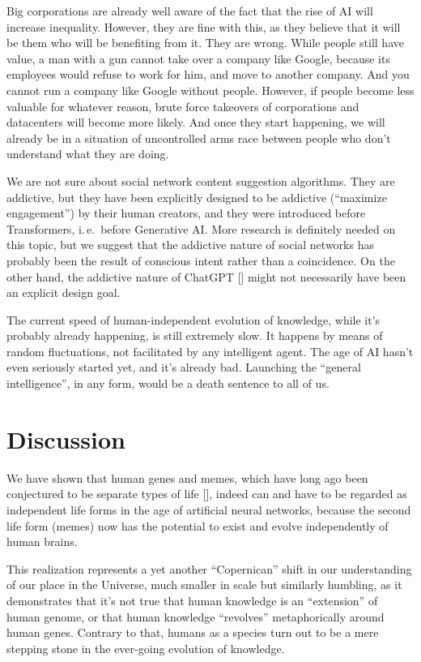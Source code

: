 \documentclass[12pt]{article}
\newcommand{\citestrut}[1]{\vphantom{[}{#1}\vphantom{]}}
\renewcommand{\cite}[1]{[\hyperlink{#1}{\citestrut{#1}}]}
\begin{document}
Big corporations are already well aware of the fact that the rise of AI will increase
inequality. However, they are fine with this, as they believe that it will be them who
will be benefiting from it. They are wrong. While people still have value, a man with a
gun cannot take over a company like Google, because its employees would refuse to work
for him, and move to another company. And you cannot run a company like Google without
people. However, if people become less valuable for whatever reason, brute force
takeovers of corporations and datacenters will become more likely. And once they start
happening, we will already be in a situation of uncontrolled arms race between people who
don't understand what they are doing.

We are not sure about social network content suggestion algorithms. They are addictive,
but they have been explicitly designed to be addictive (``maximize engagement'') by their
human creators, and they were introduced before Transformers, i.\,e.\ before Generative
AI. More research is definitely needed on this topic, but we suggest that the addictive
nature of social networks has probably been the result of conscious intent rather than a
coincidence. On the other hand, the addictive nature of ChatGPT \cite{Addiction} might
not necessarily have been an explicit design goal.

The current speed of human-independent evolution of knowledge, while it’s probably
already happening, is still extremely slow. It happens by means of random fluctuations,
not facilitated by any intelligent agent. The age of AI hasn't even seriously started
yet, and it's already bad. Launching the ``general intelligence'', in any form, would be
a death sentence to all of us.

\section{Discussion}

We have shown that human genes and memes, which have long ago been conjectured to be
separate types of life \cite{SelfishGene}, indeed can and have to be regarded as
independent life forms in the age of artificial neural networks, because the second life
form (memes) now has the potential to exist and evolve independently of human brains.

This realization represents a yet another ``Copernican'' shift in our understanding of
our place in the Universe, much smaller in scale but similarly humbling, as it
demonstrates that it's not true that human knowledge is an ``extension'' of human genome,
or that human knowledge ``revolves'' metaphorically around human genes. Contrary to that,
humans as a species turn out to be a mere stepping stone in the ever-going evolution of
knowledge.
\end{document}
